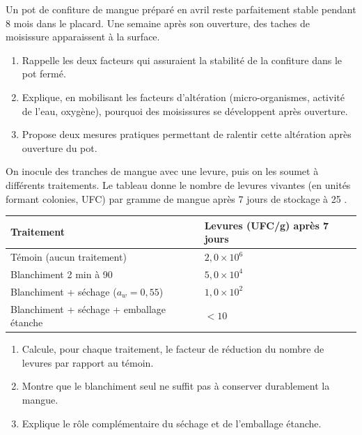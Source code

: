 \documentclass[11pt]{article}
\begin{document}
\begin{exercice}
Un pot de confiture de mangue préparé en avril reste parfaitement stable pendant 8 mois dans le placard. Une semaine après son ouverture, des taches de moisissure apparaissent à la surface.
\begin{enumerate}
\item Rappelle les deux facteurs qui assuraient la stabilité de la confiture dans le pot fermé.
\item Explique, en mobilisant les facteurs d'altération (micro-organismes, activité de l'eau, oxygène), pourquoi des moisissures se développent après ouverture.
\item Propose deux mesures pratiques permettant de ralentir cette altération après ouverture du pot.
\end{enumerate}
\end{exercice}

\begin{exercice}
On inocule des tranches de mangue avec une levure, puis on les soumet à différents traitements. Le tableau donne le nombre de levures vivantes (en unités formant colonies, UFC) par gramme de mangue après 7 jours de stockage à 25 \textcelsius.

\begin{center}
\begin{tabularx}{\linewidth}{|l|X|}\hline
\rowcolor{popblueL} Traitement & Levures (UFC/g) après 7 jours \\ \hline
Témoin (aucun traitement) & $2{,}0 \times 10^{6}$ \\ \hline
Blanchiment 2 min à 90 \textcelsius{} & $5{,}0 \times 10^{4}$ \\ \hline
Blanchiment + séchage ($a_w = 0{,}55$) & $1{,}0 \times 10^{2}$ \\ \hline
Blanchiment + séchage + emballage étanche & $< 10$ \\ \hline
\end{tabularx}
\end{center}

\begin{enumerate}
\item Calcule, pour chaque traitement, le facteur de réduction du nombre de levures par rapport au témoin.
\item Montre que le blanchiment seul ne suffit pas à conserver durablement la mangue.
\item Explique le rôle complémentaire du séchage et de l'emballage étanche.
\end{enumerate}
\end{exercice}
\end{document}
